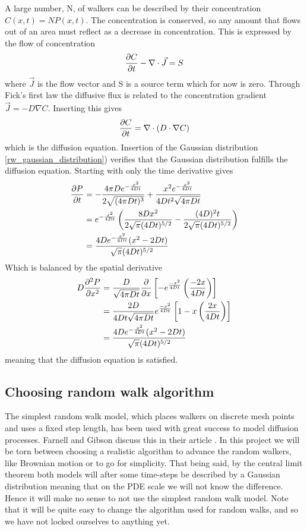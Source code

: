A large number, N, of walkers can be described by their concentration $C(x,t) = NP(x,t)$.
The concentration is conserved, so any amount that flows out of an area must reflect as a decrease in concentration. 
This is expressed by the flow of concentration
\begin{equation}
 \frac{\partial C}{\partial t} -\nabla\cdot\vec{J} = S
\end{equation}
where $\vec{J}$ is the flow vector and S is a source term which for now is zero.
Through Fick's first law the diffusive flux is related to the concentration gradient $\vec{J} = -D\nabla C$. 
Inserting this gives
\begin{equation}\label{simple_diffusion_equation}
 \frac{\partial C}{\partial t} = \nabla\cdot \left(D\cdot\nabla C\right)
\end{equation}
which is the diffusion equation.
Insertion of the Gaussian distribution \eqref{rw_gaussian_distribution}) verifies that the Gaussian distribution fulfills the diffusion equation. 
Starting with only the time derivative gives
\begin{align*}
 \frac{\partial P}{\partial t} &= -\frac{4\pi De^{-\frac{x^2}{4Dt}}}{2\sqrt{(4\pi Dt)^3}}+\frac{x^2e^{-\frac{x^2}{4Dt}}}{4Dt^2\sqrt{4\pi Dt}} \\
 &= e^{-\frac{x^2}{4Dt}}\left(\frac{8Dx^2}{2\sqrt{\pi}(4Dt)^{5/2}} -\frac{(4D)^2t}{2\sqrt{\pi}(4Dt)^{5/2}}\right)\\
 &= \frac{4De^{-\frac{x^2}{4Dt}}(x^2-2Dt)}{\sqrt{\pi}(4Dt)^{5/2}}
\end{align*}
 Which is balanced by the spatial derivative
\begin{align*}
 D\frac{\partial^2 P}{\partial x^2} &= \frac{D}{\sqrt{4\pi Dt}}\frac{\partial}{\partial x}\left[-e^{\frac{-x^2}{4Dt}}\left(\frac{-2x}{4Dt}\right)\right]\\
 &= \frac{2D}{4Dt\sqrt{4\pi Dt}}e^{\frac{-x^2}{4Dt}}\left[1-x\left(\frac{2x}{4Dt}\right)\right] \\
 &= \frac{4De^{-\frac{x^2}{4Dt}}(x^2-2Dt)}{\sqrt{\pi}(4Dt)^{5/2}}
\end{align*}
meaning that the diffusion equation is satisfied.

\subsection{Choosing random walk algorithm}\label{choosing_random_walk_algorithm}

The simplest random walk model, which places walkers on discrete mesh points and uses a fixed step length, has been used with great success to model diffusion processes. 
Farnell and Gibson discuss this in their article \cite{farnell2005monte}. 
In this project we will be torn between choosing a realistic algorithm to advance the random walkers, like Brownian motion or to go for simplicity. 
That being said, by the central limit theorem both models will after some time-steps be described by a Gaussian distribution meaning that on the PDE scale we will not know the difference. 
Hence it will make no sense to not use the simplest random walk model.
Note that it will be quite easy to change the algorithm used for random walks, and so we have not locked ourselves to anything yet.

